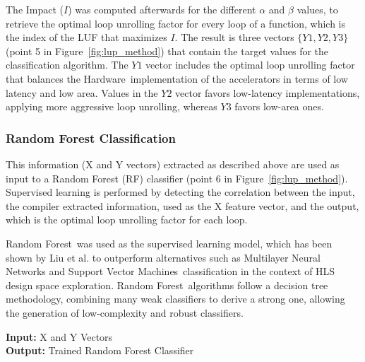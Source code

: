 \documentclass[]{usiinfthesis}
\newcommand{\HW}{{Hardware}}
\newcommand{\RF}{{Random Forest}}
\newcommand{\SVM}{{Support Vector Machines}}
\begin{document}
The Impact ($I$) was computed afterwards for the different $\alpha$
and $\beta$ values, to retrieve the optimal loop unrolling factor for every loop
of a function, which is the index of the LUF that maximizes $I$. The
result is three vectors $\{Y1,Y2,Y3\}$ (point 5 in
Figure~\ref{fig:lup_method}) that contain the target values for the
classification algorithm. The $Y1$ vector includes the optimal loop
unrolling factor that balances the \HW\ implementation of the
accelerators in terms of low latency and low area. Values in the $Y2$
vector favors low-latency implementations, applying more aggressive
loop unrolling, whereas $Y3$ favors low-area ones.


\subsubsection{Random Forest Classification}


This information (X and Y vectors) extracted as described above are used 
as input to a Random Forest (RF) classifier (point 6 in
Figure~\ref{fig:lup_method}).
Supervised learning is performed by detecting the correlation between 
the input, the compiler extracted information, used as the X feature vector, 
and the output, which is the optimal loop unrolling factor for each loop.\par

\RF\ was used as the supervised learning model, which has been shown by Liu et al.
\cite{LiuJun13} to outperform alternatives such as Multilayer Neural Networks and \SVM\  
classification in the context of HLS design space exploration. \RF\ algorithms follow
a decision tree methodology, combining many weak classifiers to derive a strong one, allowing
the generation of low-complexity and robust classifiers.\par

\begin{algorithm}[t]
\begin{flushleft}
\textbf{Input:}  X and Y Vectors\\
\textbf{Output:} Trained Random Forest Classifier\\
\end{flushleft}
\begin{algorithmic}[1]
  \State{\emph{ /*\ Training\ Phase\ */} }
\EndFor
\end{algorithmic}
\caption{Random Forest Classification -
 Training and Test} 
 \label{algo:RF}
\end{algorithm}
\end{document}
